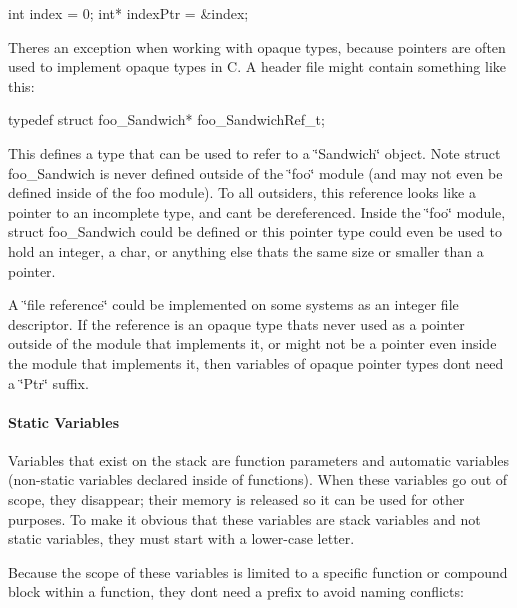 \begin{DoxyCode}
\textcolor{keywordtype}{int} index = 0;
\textcolor{keywordtype}{int}* indexPtr = &index;
\end{DoxyCode}


There\textquotesingle{}s an exception when working with opaque types, because pointers are often used to implement opaque types in C. A header file might contain something like this\+: 
\begin{DoxyCode}
\textcolor{keyword}{typedef} \textcolor{keyword}{struct }foo\_Sandwich* foo\_SandwichRef\_t;
\end{DoxyCode}
 This defines a type that can be used to refer to a \char`\"{}\+Sandwich\char`\"{} object. Note struct foo\+\_\+\+Sandwich is never defined outside of the \char`\"{}foo\char`\"{} module (and may not even be defined inside of the foo module). To all outsiders, this reference looks like a pointer to an incomplete type, and can\textquotesingle{}t be dereferenced. Inside the \char`\"{}foo\char`\"{} module, struct foo\+\_\+\+Sandwich could be defined or this pointer type could even be used to hold an integer, a char, or anything else that\textquotesingle{}s the same size or smaller than a pointer.

A \char`\"{}file reference\char`\"{} could be implemented on some systems as an integer file descriptor. If the reference is an opaque type that\textquotesingle{}s never used as a pointer outside of the module that implements it, or might not be a pointer even inside the module that implements it, then variables of opaque pointer types don\textquotesingle{}t need a \char`\"{}\+Ptr\char`\"{} suffix.\hypertarget{ccoding_stds_param_cstdsparamStaticVariables}{}\paragraph{Static Variables}\label{ccoding_stds_param_cstdsparamStaticVariables}
Variables that exist on the stack are function parameters and automatic variables (non-\/static variables declared inside of functions). When these variables go out of scope, they disappear; their memory is released so it can be used for other purposes. To make it obvious that these variables are stack variables and not static variables, they must start with a lower-\/case letter.

Because the scope of these variables is limited to a specific function or compound block within a function, they don\textquotesingle{}t need a prefix to avoid naming conflicts\+:


